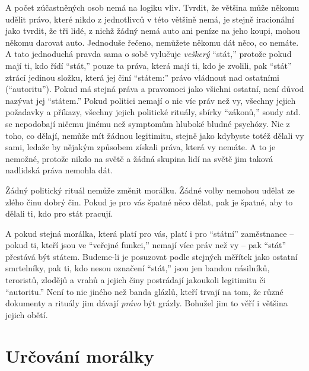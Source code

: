 \documentclass{book}
\begin{document}
A počet zúčastněných osob nemá na logiku vliv. Tvrdit, že většina může někomu udělit právo, které nikdo z jednotlivců v této většině nemá, je stejně iracionální jako tvrdit, že tři lidé, z nichž žádný nemá auto ani peníze na jeho koupi, mohou někomu darovat auto. Jednoduše řečeno, nemůžete někomu dát něco, co nemáte. A tato jednoduchá pravda sama o sobě vylučuje \emph{veškerý} \enquote{stát,} protože pokud mají ti, kdo řídí \enquote{stát,} pouze ta práva, která mají ti, kdo je zvolili, pak \enquote{stát} ztrácí jedinou složku, která jej činí \enquote{státem:} právo vládnout nad ostatními (\enquote{autoritu}). Pokud má stejná práva a pravomoci jako všichni ostatní, není důvod nazývat jej \enquote{státem.} Pokud politici nemají o nic víc práv než vy, všechny jejich požadavky a příkazy, všechny jejich politické rituály, sbírky \enquote{zákonů,} soudy atd. se nepodobají ničemu jinému než symptomům hluboké bludné psychózy. Nic z toho, co dělají, nemůže mít žádnou legitimitu, stejně jako kdybyste totéž dělali vy sami, ledaže by nějakým způsobem získali práva, která vy nemáte. A to je nemožné, protože nikdo na světě a žádná skupina lidí na světě jim taková nadlidská práva nemohla dát.

Žádný politický rituál nemůže změnit morálku. Žádné volby nemohou udělat ze zlého činu dobrý čin. Pokud je pro vás špatné něco dělat, pak je špatné, aby to dělali ti, kdo pro stát pracují.

A pokud stejná morálka, která platí pro vás, platí i pro \enquote{státní} zaměstnance -- pokud ti, kteří jsou ve \enquote{veřejné funkci,} nemají více práv než vy -- pak \enquote{stát} přestává být státem. Budeme-li je posuzovat podle stejných měřítek jako ostatní smrtelníky, pak ti, kdo nesou označení \enquote{stát,} jsou jen bandou násilníků, teroristů, zlodějů a vrahů a jejich činy postrádají jakoukoli legitimitu či \enquote{autoritu.} Není to nic jiného než banda glázlů, kteří trvají na tom, že různé dokumenty a rituály jim dávají \emph{právo} být grázly. Bohužel jim to věří i většina jejich obětí.

\section{Určování morálky}
\end{document}
